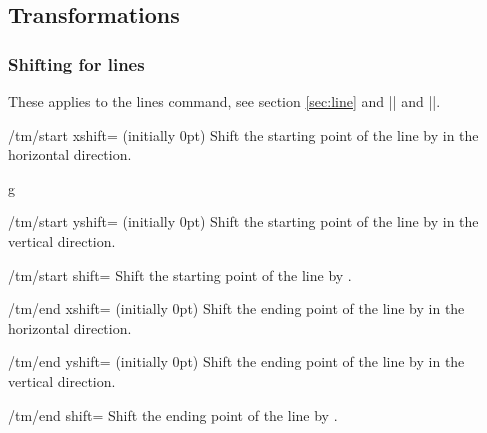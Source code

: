 \subsection{Transformations}\label{sec:custom:transformations}
\subsubsection{Shifting for lines}\label{sec:custom:transformations:lines}
These applies to the lines command, see section \ref{sec:line} and |\tmbrace| and 
|\tmbracket|.
\begin{key}{/tm/start xshift= (initially 0pt)}
  Shift the starting point of the line by  in the horizontal direction.
\end{key}
\begin{codeexample}[]
\begin{tmline}
\begin{tmstaff}{g}{}
\end{tmstaff}
\end{tmline}
\end{codeexample}
\begin{key}{/tm/start yshift= (initially 0pt)}
  Shift the starting point of the line by  in the vertical direction.
\end{key}
\begin{key}{/tm/start shift=}
  Shift the starting point of the line by .
\end{key}
\begin{key}{/tm/end xshift= (initially 0pt)}
  Shift the ending point of the line by  in the horizontal direction.
\end{key}
\begin{key}{/tm/end yshift= (initially 0pt)}
  Shift the ending point of the line by  in the vertical direction.
\end{key}
\begin{key}{/tm/end shift=}
  Shift the ending point of the line by .
\end{key}
